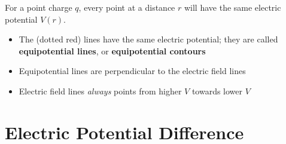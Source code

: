 %  

% 

For a point charge $q$, every point at a distance $r$ will have the same
electric potential $V(r)$.
\begin{itemize}
\item The (dotted red) lines have the same electric potential; they are
  called \textbf{equipotential lines}, or \textbf{equipotential contours}
\item Equipotential lines are perpendicular to the electric field lines
\item Electric field lines \emph{always} points from higher $V$ towards
  lower $V$
\end{itemize}

%    
%
%



\section{Electric Potential Difference}

